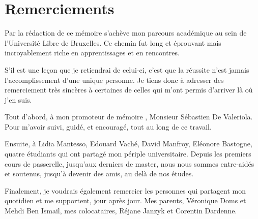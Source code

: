 \chapter*{Remerciements}

\setlength{\parskip}{0,5cm}%

Par la rédaction de ce mémoire s'achève mon parcours académique au sein de l'Université Libre de Bruxelles.
Ce chemin fut long et éprouvant  mais  incroyablement riche en apprentissages et en rencontres.

S'il est une leçon que je retiendrai de celui-ci, c'est que la réussite n'est jamais l'accomplissement d'une unique personne. Je tiens donc à adresser des remerciement très sincères à certaines de celles qui m'ont permis d'arriver là où j'en suis.

Tout d'abord, à mon promoteur de mémoire , Monsieur Sébastien De Valeriola. Pour m'avoir suivi, guidé, et encouragé, tout au long de ce travail. 

Ensuite, à Lidia Mantesso, Edouard Vaché, David Manfroy, Eléonore Bastogne, quatre étudiants qui ont partagé mon périple universitaire. Depuis les premiers cours de passerelle, jusqu'aux derniers de master, nous nous sommes entre-aidés et soutenus, jusqu'à devenir des amis, au delà de nos études.

Finalement, je voudrais également remercier les personnes qui partagent mon quotidien et me supportent, jour après jour. Mes parents, Véronique Doms et Mehdi Ben Ismail, mes colocataires, Réjane Janzyk et Corentin Dardenne. 


\setlength{\parskip}{0cm}%